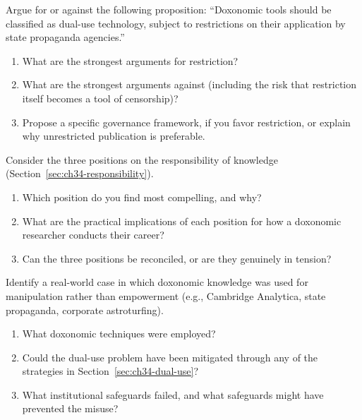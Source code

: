 \begin{exercise}
Argue for or against the following proposition: ``Doxonomic tools should be classified as dual-use technology, subject to restrictions on their application by state propaganda agencies.''
\begin{enumerate}[nosep]
  \item What are the strongest arguments for restriction?
  \item What are the strongest arguments against (including the risk that restriction itself becomes a tool of censorship)?
  \item Propose a specific governance framework, if you favor restriction, or explain why unrestricted publication is preferable.
\end{enumerate}
\end{exercise}

\begin{exercise}
Consider the three positions on the responsibility of knowledge (Section~\ref{sec:ch34-responsibility}).
\begin{enumerate}[nosep]
  \item Which position do you find most compelling, and why?
  \item What are the practical implications of each position for how a doxonomic researcher conducts their career?
  \item Can the three positions be reconciled, or are they genuinely in tension?
\end{enumerate}
\end{exercise}

\begin{exercise}
Identify a real-world case in which doxonomic knowledge was used for manipulation rather than empowerment (e.g., Cambridge Analytica, state propaganda, corporate astroturfing).
\begin{enumerate}[nosep]
  \item What doxonomic techniques were employed?
  \item Could the dual-use problem have been mitigated through any of the strategies in Section~\ref{sec:ch34-dual-use}?
  \item What institutional safeguards failed, and what safeguards might have prevented the misuse?
\end{enumerate}
\end{exercise}
